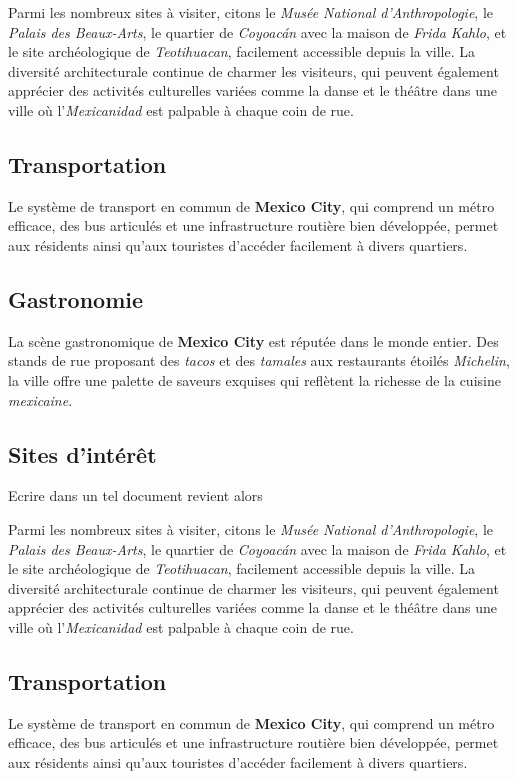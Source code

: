 \documentclass[12pt, a4paper]{article}
\begin{document}
Parmi les nombreux sites à visiter, citons le \textit{Musée National d'Anthropologie}, le \textit{Palais des Beaux-Arts}, le quartier de \textit{Coyoacán} avec la maison de \textit{Frida Kahlo}, et le site archéologique de \textit{Teotihuacan}, facilement accessible depuis la ville.
La diversité architecturale continue de charmer les visiteurs, qui peuvent également apprécier des activités culturelles variées comme la danse et le théâtre dans une ville où l'\textit{Mexicanidad} est palpable à chaque coin de rue. \subsection*{\textbf{Transportation}} Le système de transport en commun de \textbf{Mexico City}, qui comprend un métro efficace, des bus articulés et une infrastructure routière bien développée, permet aux résidents ainsi qu'aux touristes d'accéder facilement à divers quartiers.

\subsection*{\textbf{Gastronomie}}

La scène gastronomique de \textbf{Mexico City} est réputée dans le monde entier. Des stands de rue proposant des \textit{tacos} et des \textit{tamales} aux restaurants étoilés \textit{Michelin}, la ville offre une palette de saveurs exquises qui reflètent la richesse de la cuisine \textit{mexicaine}.

\subsection*{\textbf{Sites d'intérêt}}

Ecrire dans un tel document revient alors

Parmi les nombreux sites à visiter, citons le \textit{Musée National d'Anthropologie}, le \textit{Palais des Beaux-Arts}, le quartier de \textit{Coyoacán} avec la maison de \textit{Frida Kahlo}, et le site archéologique de \textit{Teotihuacan}, facilement accessible depuis la ville.
La diversité architecturale continue de charmer les visiteurs, qui peuvent également apprécier des activités culturelles variées comme la danse et le théâtre dans une ville où l'\textit{Mexicanidad} est palpable à chaque coin de rue. \subsection*{\textbf{Transportation}} Le système de transport en commun de \textbf{Mexico City}, qui comprend un métro efficace, des bus articulés et une infrastructure routière bien développée, permet aux résidents ainsi qu'aux touristes d'accéder facilement à divers quartiers.
\end{document}
